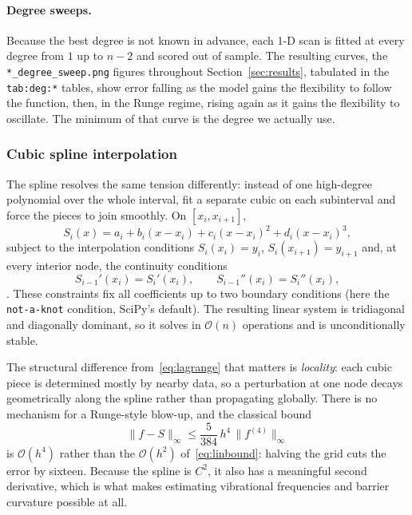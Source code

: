 \documentclass[sigconf,screen,nonacm]{acmart}
\begin{document}
\paragraph{Degree sweeps.}
Because the best degree is not known in advance, each 1-D scan is fitted at
every degree from $1$ up to $n-2$ and scored out of sample. The resulting
curves, the \texttt{*\_degree\_sweep.png} figures throughout
Section~\ref{sec:results}, tabulated in the \texttt{tab:deg:*} tables, show
error falling as the model gains the flexibility to follow the function,
then, in the Runge regime, rising again as it gains the flexibility to
oscillate. The minimum of that curve is the degree we actually use.

\subsubsection{Cubic spline interpolation}

The spline resolves the same tension differently: instead of one
high-degree polynomial over the whole interval, fit a separate cubic on each
subinterval and force the pieces to join smoothly. On $[x_i,x_{i+1}]$,
\begin{equation}
S_i(x) = a_i + b_i(x-x_i) + c_i(x-x_i)^2 + d_i(x-x_i)^3,
\end{equation}
subject to the interpolation conditions $S_i(x_i)=y_i$,
$S_i(x_{i+1})=y_{i+1}$ and, at every interior node, the continuity conditions
\begin{equation}
S_{i-1}'(x_i) = S_i'(x_i),
\qquad
S_{i-1}''(x_i) = S_i''(x_i),
\end{equation}
\cite{deboor}. These constraints fix all coefficients up to two boundary
conditions (here the \texttt{not-a-knot} condition, SciPy's default). The
resulting linear system is tridiagonal and diagonally dominant, so it solves
in $\mathcal{O}(n)$ operations and is unconditionally stable.

The structural difference from~\eqref{eq:lagrange} that matters is
\emph{locality}: each cubic piece is determined mostly by nearby data, so a
perturbation at one node decays geometrically along the spline rather than
propagating globally. There is no mechanism for a Runge-style blow-up, and
the classical bound
\begin{equation}
\|f - S\|_\infty \leq \frac{5}{384}\,h^4\,\|f^{(4)}\|_\infty
\label{eq:splinebound}
\end{equation}
is $\mathcal{O}(h^4)$ rather than the $\mathcal{O}(h^2)$
of~\eqref{eq:linbound}: halving the grid cuts the error by sixteen. Because
the spline is $C^2$, it also has a meaningful second derivative, which is
what makes estimating vibrational frequencies and barrier curvature possible
at all.
\end{document}
